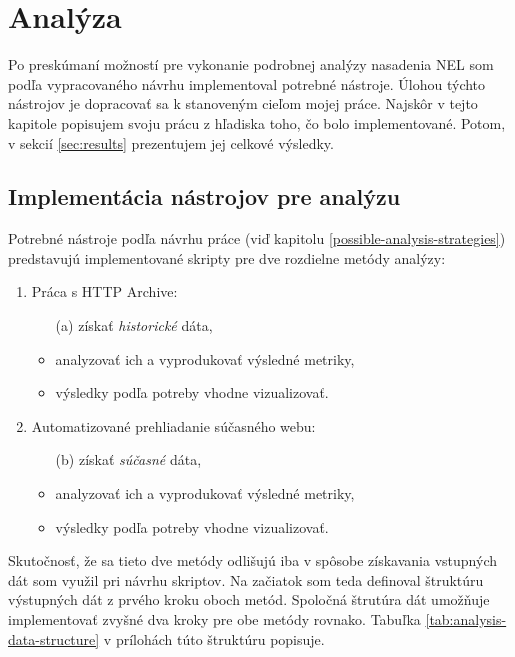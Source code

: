 \chapter{Analýza}

Po preskúmaní možností pre vykonanie podrobnej analýzy nasadenia NEL som podľa vypracovaného návrhu implementoval potrebné nástroje.
Úlohou týchto nástrojov je dopracovať sa k stanoveným cieľom mojej práce.  
Najskôr v tejto kapitole popisujem svoju prácu z hľadiska toho, čo bolo implementované.
Potom, v sekcií \ref{sec:results} prezentujem jej celkové výsledky.


\section{Implementácia nástrojov pre analýzu}

Potrebné nástroje podľa návrhu práce (viď kapitolu \ref{possible-analysis-strategies}) predstavujú implementované skripty pre dve rozdielne metódy analýzy:
\begin{enumerate}
    \item Práca s HTTP Archive:
    \begin{itemize}
        \item[(a)] získať \textit{historické} dáta, 
        \item analyzovať ich a vyprodukovať výsledné metriky,
        \item výsledky podľa potreby vhodne vizualizovať.
    \end{itemize}

    \item Automatizované prehliadanie súčasného webu:
    \begin{itemize}
        \item[(b)] získať \textit{súčasné} dáta,
        \item analyzovať ich a vyprodukovať výsledné metriky, 
        \item výsledky podľa potreby vhodne vizualizovať.
    \end{itemize}
\end{enumerate}

Skutočnosť, že sa tieto dve metódy odlišujú iba v spôsobe získavania vstupných dát som využil pri návrhu skriptov.
Na začiatok som teda definoval štruktúru výstupných dát z prvého kroku oboch metód.
Spoločná štrutúra dát umožňuje implementovať zvyšné dva kroky pre obe metódy rovnako.
Tabuľka \ref{tab:analysis-data-structure} v prílohách túto štruktúru popisuje. 

